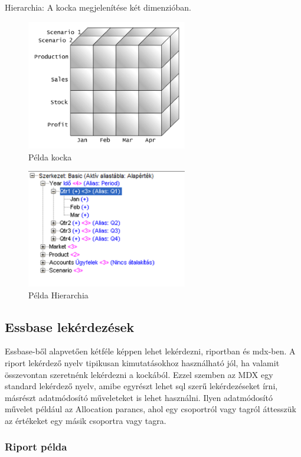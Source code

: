 Hierarchia: A kocka megjelenítése két dimenzióban.

\pagebreak

 \begin{figure}[!ht]
\centering
\includegraphics[width=70mm, keepaspectratio]{figures/cube1.png}
\caption{Példa kocka} 
\label{fig:Cube1}
\end{figure}

 \begin{figure}[!ht]
\centering
\includegraphics[width=70mm, keepaspectratio]{figures/hierarchy.png}
\caption{Példa Hierarchia} 
\label{fig:Cube1}
\end{figure}


\subsection{Essbase lekérdezések}

Essbase-ből alapvetően kétféle képpen lehet lekérdezni, riportban és mdx-ben. A riport lekérdező nyelv tipikusan kimutatásokhoz használható jól, ha valamit összevontan szeretnénk lekérdezni a kockából. Ezzel szemben az MDX egy standard lekérdező nyelv, amibe egyrészt lehet sql szerű lekérdezéseket írni, másrészt adatmódosító műveleteket is lehet használni. Ilyen adatmódosító művelet például az Allocation parancs, ahol egy csoportról vagy  tagról áttesszük az értékeket egy másik csoportra vagy tagra.

\subsubsection{Riport példa}

